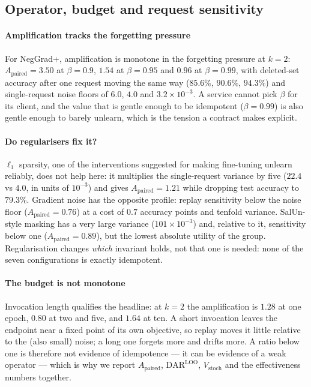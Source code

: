\documentclass[conference]{IEEEtran}
\newcommand{\dar}{\mathrm{DAR}}
\newcommand{\DLOO}{\dar^{\mathrm{LOO}}}
\newcommand{\Apa}{A_{\mathrm{paired}}}
\begin{document}
\subsection{Operator, budget and request sensitivity}
\label{sec:eval-sensitivity}

\paragraph{Amplification tracks the forgetting pressure}
For NegGrad+, amplification is monotone in the forgetting pressure at $k=2$:
$\Apa=3.50$ at $\beta=0.9$, $1.54$ at $\beta=0.95$ and $0.96$ at $\beta=0.99$, with
deleted-set accuracy after one request moving the same way ($85.6\%$, $90.6\%$,
$94.3\%$) and single-request noise floors of $6.0$, $4.0$ and $3.2\times10^{-3}$.  A
service cannot pick $\beta$ for its client, and the value that is gentle enough to be
idempotent ($\beta=0.99$) is also gentle enough to barely unlearn, which is the tension
a contract makes explicit.

\paragraph{Do regularisers fix it?}
$\ell_1$ sparsity, one of the interventions suggested for making fine-tuning unlearn
reliably, does not help here: it multiplies the single-request variance by five ($22.4$
vs $4.0$, in units of $10^{-3}$) and gives $\Apa=1.21$ while dropping test accuracy to
$79.3\%$.  Gradient noise has the opposite profile: replay sensitivity below the noise
floor ($\Apa=0.76$) at a cost of $0.7$ accuracy points and tenfold variance.
SalUn-style masking has a very large variance ($101\times10^{-3}$) and, relative to it,
sensitivity below one ($\Apa=0.89$), but the lowest absolute utility of the group.
Regularisation changes \emph{which} invariant holds, not that one is needed: none of the
seven configurations is exactly idempotent.

\paragraph{The budget is not monotone}
Invocation length qualifies the headline: at $k=2$ the amplification is $1.28$ at one
epoch, $0.80$ at two and five, and $1.64$ at ten.  A short invocation leaves the
endpoint near a fixed point of its own objective, so replay moves it little relative to
the (also small) noise; a long one forgets more and drifts more.  A ratio below one is
therefore not evidence of idempotence --- it can be evidence of a weak operator --- which
is why we report $\Apa$, $\DLOO$, $V_{\text{stoch}}$ and the effectiveness numbers
together.
\end{document}
